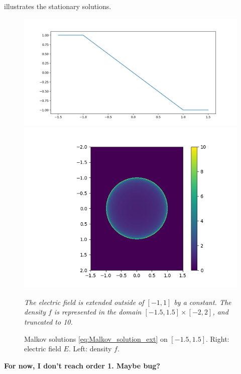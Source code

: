 \documentclass{article}
\numberwithin{equation}{section}
\newcommand{\todo}[1]{{\color{red}\textbf{#1}}}
\newcommand{\mysubcaption}[1]{
	\vspace*{5pt}
	\begin{minipage}{0.8\linewidth}
		\begin{center}
			\footnotesize\emph{#1}
		\end{center}
	\end{minipage}
}
\newcommand{\imh}{\textheight} %
\begin{document}
 illustrates the stationary solutions.

\begin{figure}
	\centering
	\renewcommand{\imh}{0.33\linewidth}
	\includegraphics[trim = 50 10 55 30, clip, height=\imh]{images/malkov_solution_Ee}
	\includegraphics[trim = 100 10 60 30, clip, height=\imh]{images/malkov_solution_fe}
	\caption{Malkov solutions \cref{eq:Malkov_solution_ext} on $[-1.5,1.5]$. Right: electric field $E$. Left: density $f$.}
	\mysubcaption{The electric field is extended outside of $[-1,1]$ by a constant. The density $f$ is represented in the domain $[-1.5,1.5]\times[-2,2]$, and truncated to 10.}
	\label{fig:malkov_solutions}
\end{figure}

\todo{For now, I don't reach order 1. Maybe bug?}

	
	
\end{document}

